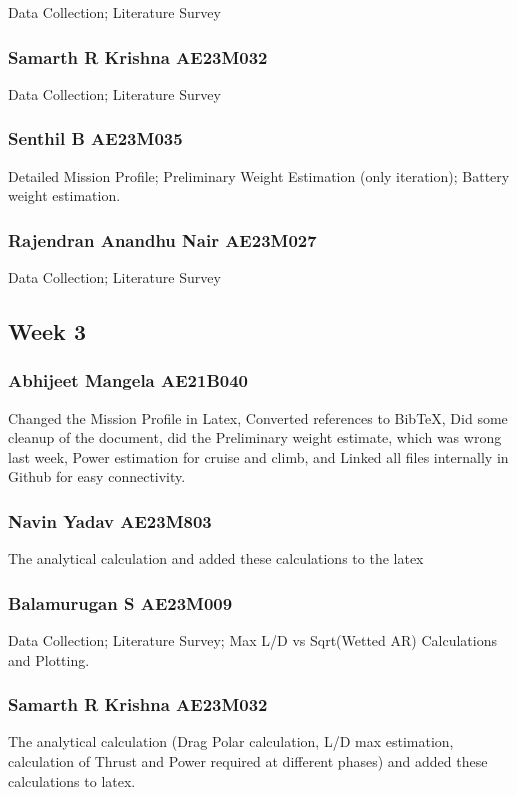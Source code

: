 \documentclass[12 pt]{article}
\begin{document}
{{Data Collection; Literature Survey

\subsubsection{Samarth R Krishna AE23M032}

Data Collection; Literature Survey

\subsubsection{Senthil B AE23M035}

Detailed Mission Profile; Preliminary Weight Estimation (only iteration); Battery weight estimation.

\subsubsection{Rajendran Anandhu Nair AE23M027}

Data Collection; Literature Survey




\subsection{Week 3}


\subsubsection{Abhijeet Mangela AE21B040}
Changed the Mission Profile in Latex, Converted references to BibTeX, Did some cleanup of the document, did the Preliminary weight estimate, which was wrong last week, Power estimation for cruise and climb, and Linked all files internally in Github for easy connectivity.

\subsubsection{Navin Yadav AE23M803}
The analytical calculation and added these calculations to the latex 

\subsubsection{Balamurugan S AE23M009}
Data Collection; Literature Survey; Max L/D vs Sqrt(Wetted AR) Calculations and Plotting.


\subsubsection{Samarth R Krishna AE23M032}
The analytical calculation (Drag Polar calculation, L/D max estimation, calculation of Thrust and Power required at different phases) and added these calculations to latex.


}}
\end{document}
